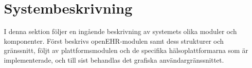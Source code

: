 \documentclass[techdoc/techdoc.tex]{subfiles}
\begin{document}
\section{Systembeskrivning}
I denna sektion följer en ingående beskrivning av systemets olika moduler och
komponenter. Först beskrivs openEHR-modulen samt dess strukturer och
gränssnitt, följt av plattformsmodulen och de specifika hälsoplattformarna som
är implementerade, och till sist behandlas det grafiska användargränssnittet.





\end{document}
